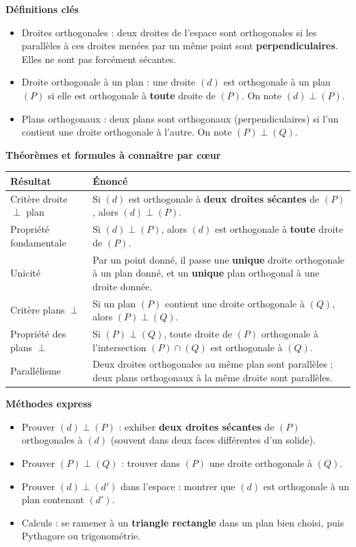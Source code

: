 \documentclass[11pt]{article}
\newcommand{\cle}[1]{{\popxbold\color{popdark}#1}}
\begin{document}
\begin{bilan}
\textbf{Définitions clés}
\begin{itemize}
  \item \cle{Droites orthogonales} : deux droites de l'espace sont orthogonales si les parallèles à ces droites menées par un même point sont \textbf{perpendiculaires}. Elles ne sont pas forcément sécantes.
  \item \cle{Droite orthogonale à un plan} : une droite $(d)$ est orthogonale à un plan $(P)$ si elle est orthogonale à \textbf{toute} droite de $(P)$. On note $(d)\perp(P)$.
  \item \cle{Plans orthogonaux} : deux plans sont orthogonaux (perpendiculaires) si l'un contient une droite orthogonale à l'autre. On note $(P)\perp(Q)$.
\end{itemize}

\textbf{Théorèmes et formules à connaître par cœur}
\begin{center}
\begin{tabularx}{\linewidth}{|l|X|}
\hline
\rowcolor{popblueL} \textbf{Résultat} & \textbf{Énoncé} \\
\hline
Critère droite $\perp$ plan & Si $(d)$ est orthogonale à \textbf{deux droites sécantes} de $(P)$, alors $(d)\perp(P)$. \\
\hline
Propriété fondamentale & Si $(d)\perp(P)$, alors $(d)$ est orthogonale à \textbf{toute} droite de $(P)$. \\
\hline
Unicité & Par un point donné, il passe une \textbf{unique} droite orthogonale à un plan donné, et un \textbf{unique} plan orthogonal à une droite donnée. \\
\hline
Critère plans $\perp$ & Si un plan $(P)$ contient une droite orthogonale à $(Q)$, alors $(P)\perp(Q)$. \\
\hline
Propriété des plans $\perp$ & Si $(P)\perp(Q)$, toute droite de $(P)$ orthogonale à l'intersection $(P)\cap(Q)$ est orthogonale à $(Q)$. \\
\hline
Parallélisme & Deux droites orthogonales au même plan sont parallèles ; deux plans orthogonaux à la même droite sont parallèles. \\
\hline
\end{tabularx}
\end{center}

\textbf{Méthodes express}
\begin{itemize}
  \item Prouver $(d)\perp(P)$ : exhiber \textbf{deux droites sécantes} de $(P)$ orthogonales à $(d)$ (souvent dans deux faces différentes d'un solide).
  \item Prouver $(P)\perp(Q)$ : trouver dans $(P)$ une droite orthogonale à $(Q)$.
  \item Prouver $(d)\perp(d')$ dans l'espace : montrer que $(d)$ est orthogonale à un plan contenant $(d')$.
  \item Calculs : se ramener à un \textbf{triangle rectangle} dans un plan bien choisi, puis Pythagore ou trigonométrie.
\end{itemize}
\end{bilan}
\end{document}
